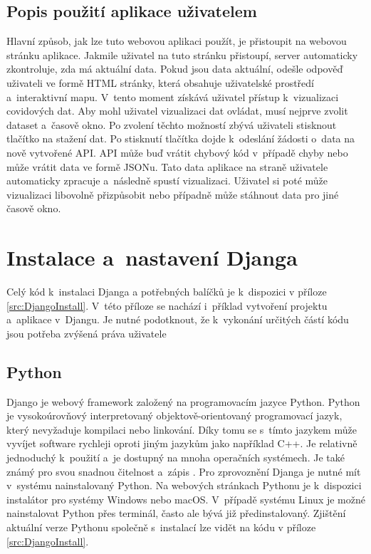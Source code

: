 \subsection{Popis použití aplikace uživatelem}

Hlavní způsob, jak lze tuto webovou aplikaci použít, je přistoupit na webovou stránku aplikace. Jakmile uživatel na tuto stránku přistoupí, server automaticky zkontroluje, zda má aktuální data. Pokud jsou data aktuální, odešle odpověď uživateli ve formě HTML stránky, která obsahuje uživatelské prostředí a~interaktivní mapu. V~tento moment získává uživatel přístup k~vizualizaci covidových dat. Aby mohl uživatel vizualizaci dat ovládat, musí nejprve zvolit dataset a~časově okno. Po zvolení těchto možností zbývá uživateli stisknout tlačítko na stažení dat. Po stisknutí tlačítka dojde k~odeslání žádosti o~data na nově vytvořené API. API může buď vrátit chybový kód v~případě chyby nebo může vrátit data ve formě JSONu. Tato data aplikace na straně uživatele automaticky zpracuje a~následně spustí vizualizaci. Uživatel si poté může vizualizaci libovolně přizpůsobit nebo případně může stáhnout data pro jiné časově okno.

\section{Instalace a~nastavení Djanga}

Celý kód k~instalaci Djanga a potřebných balíčků je k~dispozici v příloze \ref{src:DjangoInstall}. V~této příloze se nachází i~příklad vytvoření projektu a~aplikace v~Djangu. Je nutné podotknout, že k~vykonání určitých částí kódu jsou potřeba zvýšená práva uživatele

\subsection{Python}

Django je webový framework založený na programovacím jazyce Python. Python je vysokoúrovňový interpretovaný objektově-orientovaný programovací jazyk, který nevyžaduje kompilaci nebo linkování. Díky tomu se s~tímto jazykem může vyvíjet software rychleji oproti jiným jazykům jako například C++. Je relativně jednoduchý k~použití a~je dostupný na mnoha operačních systémech. Je také známý pro svou snadnou čitelnost a~zápis \cite{google-scholar-python}. Pro zprovoznění Djanga je nutné mít v~systému nainstalovaný Python. Na webových stránkach Pythonu \cite{python-download} je k~dispozici instalátor pro systémy Windows nebo macOS. V~případě systému Linux je možné nainstalovat Python přes terminál, často ale bývá již předinstalovaný. Zjištění aktuální verze Pythonu společně s~instalací lze vidět na kódu v příloze \ref{src:DjangoInstall}.

